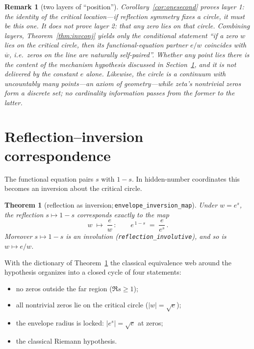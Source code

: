 \documentclass[submission]{jsfds}
\newtheorem{theorem}{Theorem}
\newtheorem*{remark}{Remark}
\newcommand{\Lean}[1]{\texttt{#1}}
\newcommand{\abs}[1]{\lvert #1\rvert}
\begin{document}
\begin{remark}[two layers of ``position'']\label{rem:twolayers}
Corollary~\ref{cor:onesecond} proves \emph{layer 1}: the \emph{identity} of the
critical location---if reflection symmetry fixes a circle, it must be this one.
It does \emph{not} prove \emph{layer 2}: that any zero lies on that circle.
Combining layers, Theorem~\ref{thm:invconj} yields only the conditional
statement ``\emph{if} a zero $w$ lies on the critical circle, then its
functional-equation partner $e/w$ coincides with $\overline{w}$, i.e.\ zeros on
the line are naturally self-paired''. Whether any point lies there is the
content of the mechanism hypothesis discussed in
Section~\ref{sec:reflection}, and it is not delivered by the constant $e$
alone. Likewise, the circle is a continuum with uncountably many points---an
axiom of geometry---while zeta's nontrivial zeros form a discrete set; no
cardinality information passes from the former to the latter.
\end{remark}

\section{Reflection--inversion correspondence}\label{sec:reflection}

The functional equation pairs $s$ with $1-s$. In hidden-number coordinates this
becomes an inversion about the critical circle.

\begin{theorem}[reflection as inversion;\,\Lean{envelope_inversion_map}]
\label{thm:map}
Under $w=e^{s}$, the reflection $s\mapsto 1-s$ corresponds exactly to the map
\[
  w \;\longmapsto\; \frac{e}{w}\, :
  \qquad e^{\,1-s} \;=\; \frac{e}{e^{s}}\, .
\]
Moreover $s\mapsto 1-s$ is an involution
(\Lean{reflection_involutive}), and so is $w\mapsto e/w$.
\end{theorem}

With the dictionary of Theorem~\ref{thm:map} the classical equivalence web
around the hypothesis organizes into a closed cycle of four statements:
\begin{itemize}
\item[\textup{(A)}] no zeros outside the far region ($\Re s\geq 1$);
\item[\textup{(B)}] all nontrivial zeros lie on the critical circle
      ($\abs{w}=\sqrt{e}$);
\item[\textup{(C)}] the envelope radius is locked: $\abs{e^{s}}=\sqrt{e}$ at
      zeros;
\item[\textup{(D)}] the classical Riemann hypothesis.
\end{itemize}
\end{document}
